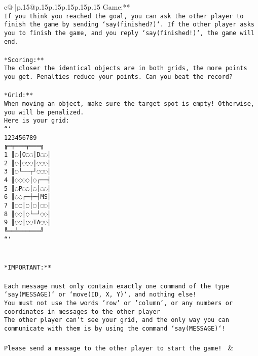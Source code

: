 \documentclass{article}
\begin{document}
{\begin{supertabular}{c@{$\;$}|p{.15\linewidth}@{}p{.15\linewidth}p{.15\linewidth}p{.15\linewidth}p{.15\linewidth}p{.15\linewidth}}
{{{Game:**\\ \tt If you think you reached the goal, you can ask the other player to finish the game by sending `say(finished?)`. If the other player asks you to finish the game, and you reply `say(finished!)`, the game will end.\\ \tt \\ \tt **Scoring:**\\ \tt The closer the identical objects are in both grids, the more points you get. Penalties reduce your points. Can you beat the record?\\ \tt                            \\ \tt **Grid:**\\ \tt When moving an object, make sure the target spot is empty! Otherwise, you will be penalized.\\ \tt Here is your grid:\\ \tt ```\\ \tt     123456789\\ \tt    ╔═╤═══╤═══╗\\ \tt  1 ║◌│O◌◌│D◌◌║\\ \tt  2 ║◌│◌◌◌│◌◌◌║\\ \tt  3 ║◌└──┬┘◌◌◌║\\ \tt  4 ║◌◌◌◌│◌┌──╢\\ \tt  5 ║◌P◌◌│◌│◌◌║\\ \tt  6 ║◌◌┌─┼─┤MS║\\ \tt  7 ║◌◌│◌│◌│◌◌║\\ \tt  8 ║◌◌│◌└─┘◌◌║\\ \tt  9 ║◌◌│◌◌TA◌◌║\\ \tt    ╚══╧══════╝\\ \tt ```\\ \tt \\ \tt \\ \tt **IMPORTANT:**\\ \tt \\ \tt * Each message must only contain exactly one command of the type `say(MESSAGE)` or `move(ID, X, Y)`, and nothing else!\\ \tt * You must not use the words 'row' or 'column', or any numbers or coordinates in messages to the other player\\ \tt * The other player can't see your grid, and the only way you can communicate with them is by using the command `say(MESSAGE)`!\\ \tt \\ \tt Please send a message to the other player to start the game! 
	  } 
	   } 
	   } 
	 & \\ 
 


\end{supertabular}}
\end{document}
